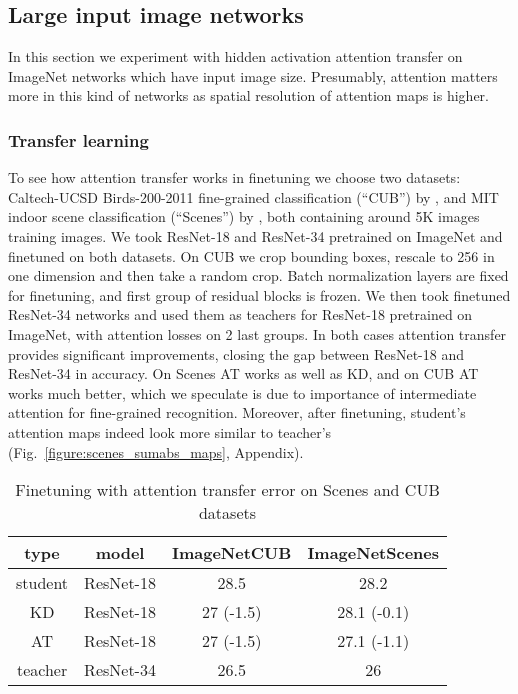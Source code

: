 \documentclass{article} \usepackage{iclr2017_conference}
\begin{document}
\subsection{Large input image networks}

In this section we experiment with hidden activation attention transfer on ImageNet networks which have  input image size. Presumably, attention matters more in this kind of networks as spatial resolution of attention maps is higher.

\subsubsection{Transfer learning}

To see how attention transfer works in finetuning we choose two datasets: Caltech-UCSD Birds-200-2011 fine-grained classification (“CUB”) by \cite{WahCUB_200_2011}, and MIT indoor scene classification (“Scenes”) by \cite{scenes}, both containing around 5K images training images. We took ResNet-18 and ResNet-34 pretrained on ImageNet and finetuned on both datasets. On CUB we crop bounding boxes, rescale to 256 in one dimension and then take a random crop. Batch normalization layers are fixed for finetuning, and first group of residual blocks is frozen. We then took finetuned ResNet-34 networks and used them as teachers for ResNet-18 pretrained on ImageNet, with  attention losses on 2 last groups. In both cases attention transfer provides significant improvements, closing the gap between ResNet-18 and ResNet-34 in accuracy. On Scenes AT works as well as KD, and on CUB AT works much better, which we speculate is due to importance of intermediate attention for fine-grained recognition. Moreover, after finetuning, student's attention maps indeed look more similar to teacher's (Fig.~\ref{figure:scenes_sumabs_maps}, Appendix).

\begin{table}
  \vspace{-0.1cm}
  \centering\small
  \begin{tabular}{|c|c|c|c|}
    \hline
    type & model & ImageNetCUB & ImageNetScenes \\ \hline
    student & ResNet-18 & 28.5 & 28.2 \\
    KD      & ResNet-18 & 27 (-1.5)   & 28.1 (-0.1) \\
    AT      & ResNet-18 & 27 (-1.5)   & 27.1 (-1.1) \\
    teacher & ResNet-34 & 26.5 & 26 \\ \hline
  \end{tabular}
  \caption{Finetuning with attention transfer error on Scenes and CUB datasets}
  \label{at:scenes_cub}
\end{table}
\end{document}
